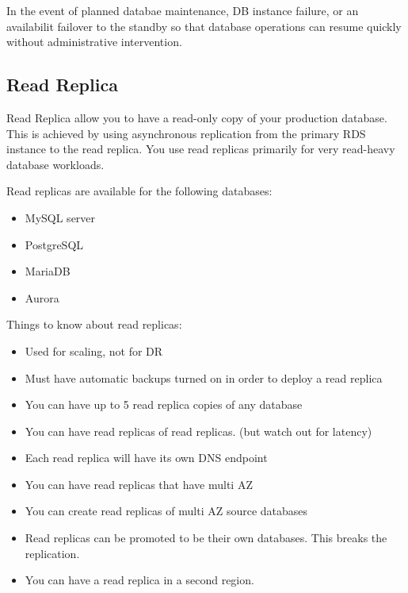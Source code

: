\documentclass{article}
\begin{document}
In the event of planned databae maintenance, DB instance failure, or an availabilit failover to the standby so that database operations can resume quickly without administrative intervention.

\subsection{Read Replica}
Read Replica allow you to have a read-only copy of your production database. This is achieved by using asynchronous replication from the primary RDS instance to the read replica. You use read replicas primarily for very read-heavy database workloads.

Read replicas are available for the following databases:
\begin{itemize}
\item
MySQL server

\item
PostgreSQL

\item
MariaDB

\item
Aurora
\end{itemize}

Things to know about read replicas:
\begin{itemize}
\item
Used for scaling, not for DR

\item
Must have automatic backups turned on in order to deploy a read replica

\item
You can have up to 5 read replica copies of any database

\item
You can have read replicas of read replicas. (but watch out for latency)

\item
Each read replica will have its own DNS endpoint

\item
You can have read replicas that have multi AZ

\item
You can create read replicas of multi AZ source databases

\item
Read replicas can be promoted to be their own databases. This breaks the replication.

\item
You can have a read replica in a second region.
\end{itemize}
\end{document}
